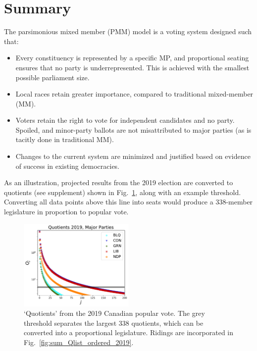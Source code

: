 \section*{Summary}
\renewcommand{\thefigure}{S-\arabic{figure}}

The parsimonious mixed member (PMM) model is a voting system designed such that:

\begin{itemize}
\item Every constituency is represented by a specific MP, and proportional seating ensures that no party is underrepresented. This is achieved with the smallest possible parliament size. 
\item Local races retain greater importance, compared to traditional mixed-member (MM).
\item Voters retain the right to vote for independent candidates and no party. Spoiled, and minor-party ballots are not misattributed to major parties (as is tacitly done in traditional MM).
\item Changes to the current system are minimized and justified based on evidence of success in existing democracies.
\end{itemize}

As an illustration, projected results from the 2019 election are converted to quotients (see supplement) shown in Fig.~\ref{fig:sum_Qlist_byparty_2019}, along with an example threshold. Converting all data points above this line into seats would produce a 338-member legislature in proportion to popular vote. 
\begin{figure}[h!]
  \includegraphics[width=0.50\textwidth,clip]{PR_calcs/data/raw_2019/PMM_out/PMM_Qlist_byparty.pdf}
  \caption{`Quotients' from the 2019 Canadian popular vote. The grey threshold separates the largest 338 quotients, which can be converted into a proportional legislature. Ridings are incorporated in Fig.~\ref{fig:sum_Qlist_ordered_2019}. }
\label{fig:sum_Qlist_byparty_2019}
\end{figure}

